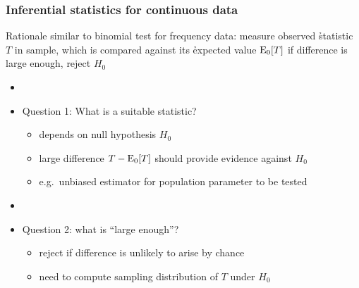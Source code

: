 \documentclass[t]{beamer} %
\begin{document}
\begin{frame}
  \frametitle{Inferential statistics for continuous data}

  Rationale similar to binomial test for frequency data:
  measure observed \h{statistic} $T$ in sample, which is compared against its
  \h{expected} value $\Exp[0]{T}$ \so if difference is large enough, reject $H_0$
  \begin{itemize}
  \item[]
  \item<2-> Question 1: What is a suitable statistic?
    \begin{itemize}
    \item depends on null hypothesis $H_0$
    \item large difference $T - \Exp[0]{T}$ should provide evidence against $H_0$
    \item e.g.\ unbiased estimator for population parameter to be tested
    \end{itemize}
  \item[]
  \item<3-> Question 2: what is ``large enough''?
    \begin{itemize}
    \item reject if difference is unlikely to arise by chance
    \item need to compute sampling distribution of $T$ under $H_0$
    \end{itemize}
  \end{itemize}
\end{frame}
\end{document}
